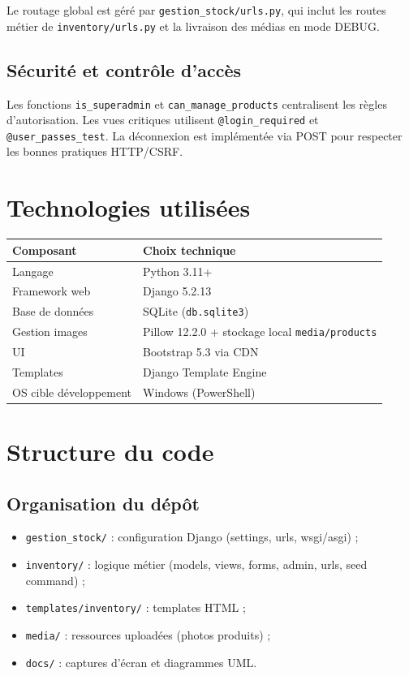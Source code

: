 \documentclass[11pt,a4paper]{article}
\begin{document}
Le routage global est g\'er\'e par \texttt{gestion\_stock/urls.py}, qui inclut les routes m\'etier de \texttt{inventory/urls.py} et la livraison des m\'edias en mode DEBUG.

\subsection{S\'ecurit\'e et contr\^ole d'acc\`es}
Les fonctions \texttt{is\_superadmin} et \texttt{can\_manage\_products} centralisent les r\`egles d'autorisation. Les vues critiques utilisent \texttt{@login\_required} et \texttt{@user\_passes\_test}. La d\'econnexion est impl\'ement\'ee via POST pour respecter les bonnes pratiques HTTP/CSRF.

\section{Technologies utilis\'ees}
\begin{longtable}{p{4.2cm}p{10cm}}
\toprule
\textbf{Composant} & \textbf{Choix technique} \\
\midrule
Langage & Python 3.11+ \\
Framework web & Django 5.2.13 \\
Base de donn\'ees & SQLite (\texttt{db.sqlite3}) \\
Gestion images & Pillow 12.2.0 + stockage local \texttt{media/products} \\
UI & Bootstrap 5.3 via CDN \\
Templates & Django Template Engine \\
OS cible d\'eveloppement & Windows (PowerShell) \\
\bottomrule
\end{longtable}

\section{Structure du code}
\subsection{Organisation du d\'ep\^ot}
\begin{itemize}[leftmargin=1.2cm]
  \item \texttt{gestion\_stock/} : configuration Django (settings, urls, wsgi/asgi) ;
  \item \texttt{inventory/} : logique m\'etier (models, views, forms, admin, urls, seed command) ;
  \item \texttt{templates/inventory/} : templates HTML ;
  \item \texttt{media/} : ressources upload\'ees (photos produits) ;
  \item \texttt{docs/} : captures d'\'ecran et diagrammes UML.
\end{itemize}
\end{document}

